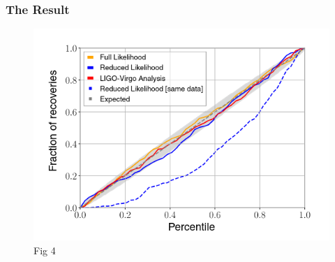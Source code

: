 \documentclass[10pt]{beamer}
\begin{document}
\begin{frame}
  \frametitle{The Result}
  \begin{figure}
    \centering
    \includegraphics[scale=.45]{fig4.png}
    \caption{Fig 4}
  \end{figure}
\end{frame}
\end{document}
